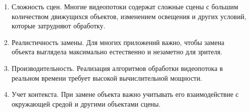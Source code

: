 \begin{enumerate}
    \item Сложность сцен. Многие видеопотоки содержат сложные сцены с большим количеством движущихся объектов, изменением освещения и других условий, которые затрудняют обработку.

    \item Реалистичность замены. Для многих приложений важно, чтобы замена объекта выглядела максимально естественно и незаметно для зрителя.

    \item Производительность. Реализация алгоритмов обработки видеопотока в реальном времени требует высокой вычислительной мощности.

    \item Учет контекста. При замене объекта важно учитывать его взаимодействие с окружающей средой и другими объектами сцены.
\end{enumerate}